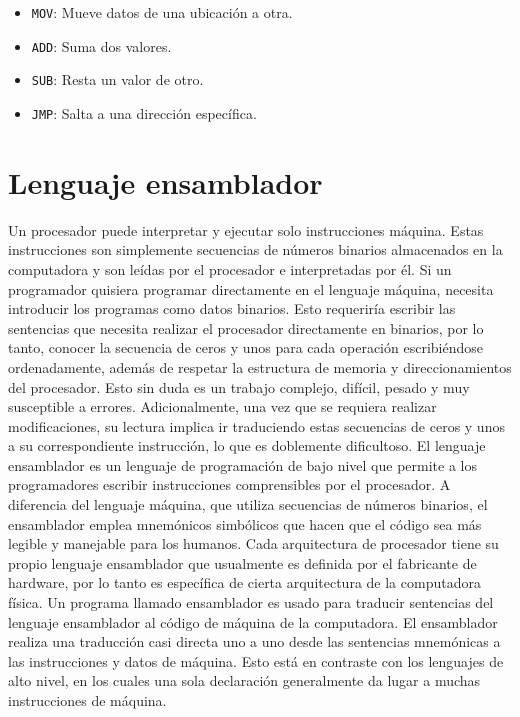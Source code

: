 \documentclass[12pt,twoside]{templates/unerthesis}
\providecommand{\tightlist}{%
  \setlength{\itemsep}{0pt}\setlength{\parskip}{0pt}}
\begin{document}
\begin{itemize}
\tightlist
\item
  \texttt{MOV}: Mueve datos de una ubicación a otra.
\item
  \texttt{ADD}: Suma dos valores.
\item
  \texttt{SUB}: Resta un valor de otro.
\item
  \texttt{JMP}: Salta a una dirección específica.
\end{itemize}

\hypertarget{lenguaje-ensamblador}{%
\section{Lenguaje ensamblador}\label{lenguaje-ensamblador}}

Un procesador puede interpretar y ejecutar solo instrucciones máquina. Estas instrucciones son simplemente secuencias de números binarios almacenados en la computadora y son leídas por el procesador e interpretadas por él. Si un programador quisiera programar directamente en el lenguaje máquina, necesita introducir los programas como datos binarios. Esto requeriría escribir las sentencias que necesita realizar el procesador directamente en binarios, por lo tanto, conocer la secuencia de ceros y unos para cada operación escribiéndose ordenadamente, además de respetar la estructura de memoria y direccionamientos del procesador. Esto sin duda es un trabajo complejo, difícil, pesado y muy susceptible a errores. Adicionalmente, una vez que se requiera realizar modificaciones, su lectura implica ir traduciendo estas secuencias de ceros y unos a su correspondiente instrucción, lo que es doblemente dificultoso.
El lenguaje ensamblador es un lenguaje de programación de bajo nivel que permite a los programadores escribir instrucciones comprensibles por el procesador. A diferencia del lenguaje máquina, que utiliza secuencias de números binarios, el ensamblador emplea mnemónicos simbólicos que hacen que el código sea más legible y manejable para los humanos. Cada arquitectura de procesador tiene su propio lenguaje ensamblador que usualmente es definida por el fabricante de hardware, por lo tanto es específica de cierta arquitectura de la computadora física. Un programa llamado ensamblador es usado para traducir sentencias del lenguaje ensamblador al código de máquina de la computadora. El ensamblador realiza una traducción casi directa uno a uno desde las sentencias mnemónicas a las instrucciones y datos de máquina. Esto está en contraste con los lenguajes de alto nivel, en los cuales una sola declaración generalmente da lugar a muchas instrucciones de máquina.
\end{document}
